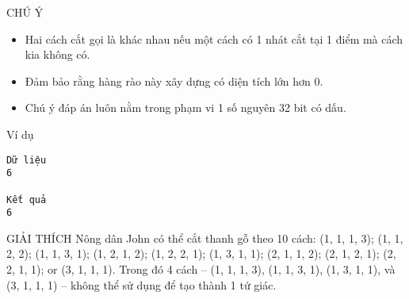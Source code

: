 CHÚ Ý  
\begin{itemize}
	\item     Hai cách cắt gọi là khác nhau nếu một cách có 1 nhát cắt tại 1     điểm mà cách kia không có.   
	\item     Đảm bảo rằng hàng rào này xây dựng có diện tích lớn hơn 0.   
	\item     Chú ý đáp án luôn nằm trong phạm vi 1 số nguyên 32 bit có dấu.   
\end{itemize}
   Ví dụ  
\begin{verbatim}
Dữ liệu
6

Kết quả
6
\end{verbatim}
   GIẢI THÍCH  
Nông dân John có thể cắt thanh gỗ theo 10 cách: (1, 1, 1, 3); (1, 1, 2, 2); (1, 1, 3, 1); (1, 2, 1, 2); (1, 2, 2, 1); (1, 3, 1, 1); (2, 1, 1, 2); (2, 1, 2, 1); (2, 2, 1, 1); or (3, 1, 1, 1). Trong đó 4 cách -- (1, 1, 1, 3), (1, 1, 3, 1), (1, 3, 1, 1), và (3, 1, 1, 1) -- không thể sử dụng để tạo thành 1 tứ giác.